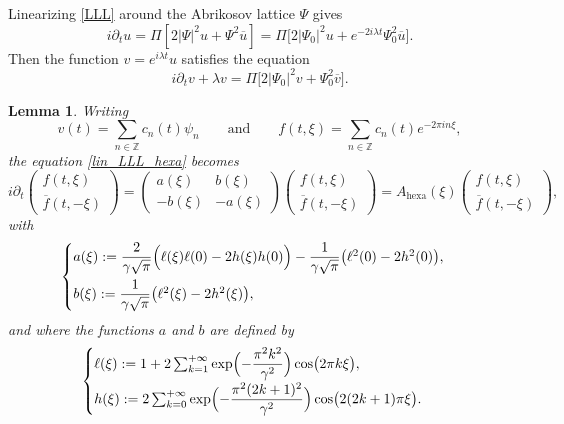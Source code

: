\documentclass[10pt]{amsart}
\newtheorem{lemme}[theorem]{Lemma}
\theoremstyle{definition}
\let\EE\exp
\let\dis\relax
\let\ov\overline
\newcommand\Z{\mathbb Z}
\newcommand{\bpa}[1]{\bigl(#1\bigr)}
\newcommand{\pac}[1]{\left[#1\right]}
\newcommand{\bpac}[1]{\bigl[#1\bigr]}
\begin{document}
Linearizing \eqref{LLL} around the Abrikosov lattice $\Psi$ gives
\begin{equation}
i\partial_t u = \Pi\pac{2|\Psi|^2u+\Psi^2\ov{u}} = \Pi\bpac{2|\Psi_0|^2u+e^{-2i\lambda t}\Psi_0^2\ov{u}}.
\end{equation}
Then the function $v = e^{i\lambda t}u$ satisfies the equation
\begin{equation}\label{lin_LLL_hexa}
\tag{LLLhexa}
i\partial_t v + \lambda v = \Pi\bpac{2|\Psi_0|^2v+\Psi_0^2\ov{v}}.
\end{equation}

\begin{lemme}
\label{lemmaformula}
Writing\enlargethispage{-\baselineskip}
\[
v(t) = \sum_{n \in \Z} c_n(t) \psi_n \qquad \text{and} \qquad
f(t,\xi) = \sum_{n \in \Z} c_n(t) e^{-2\pi i n\xi},
\]
the equation \eqref{lin_LLL_hexa} becomes
\[
i \partial_t \begin{pmatrix} {f}(t,\xi) \\[3pt] \overline{{f}}(t,-\xi) \end{pmatrix} = \begin{pmatrix} a(\xi) & b(\xi) \\[3pt] -b(\xi) & -a(\xi) \end{pmatrix} \begin{pmatrix} {f}(t,\xi) \\[3pt] \overline{{f}}(t,-\xi) \end{pmatrix} = A_{\mathrm{hexa}}(\xi) \begin{pmatrix} {f}(t,\xi) \\[3pt] \overline{{f}}(t,-\xi) \end{pmatrix},
\]
with
\[
\begin{cases}
\dis a(\xi):= \dfrac{2}{\gamma\sqrt{\pi}}\Bigl({\ell(\xi)\ell(0)-2h(\xi)h(0)}\Bigr) - \dfrac{1}{\gamma\sqrt{\pi}}\bpa{\ell^2(0)-2h^2(0)}, \\[9pt]
\dis b(\xi):= \dfrac{1}{\gamma\sqrt{\pi}}\bpa{\ell^2(\xi)-2h^2(\xi)},
\end{cases}
\]
and where the functions $a$ and $b$ are defined by
\[
\begin{cases}
\dis \ell(\xi):= 1 + 2 \sum_{k=1}^{+\infty}\EE\Bigl(-\dfrac{\pi^2k^2}{\gamma^2}\Bigr)\cos\bigl({2\pi k\xi}\bigr), \\[6pt]
\dis h(\xi):= 2 \sum_{k=0}^{+\infty}\EE\Bigl(-\dfrac{\pi^2(2k+1)^2}{\gamma^2}\Bigr)\cos\bigl({2(2k+1)\pi \xi}\bigr).
\end{cases}
\]
\end{lemme}
\end{document}
